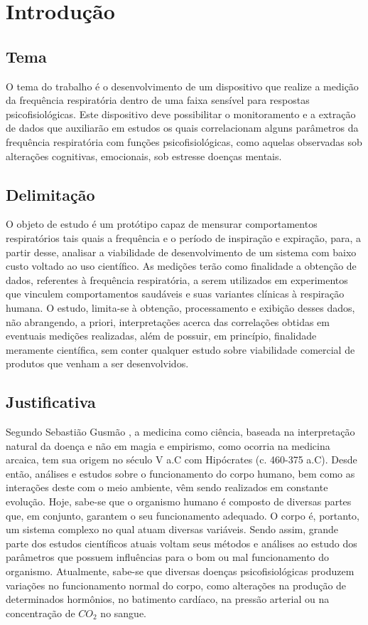 \chapter{Introdução}

	\section{Tema}
	
		O tema do trabalho é o desenvolvimento de um dispositivo que realize a medição da frequência respiratória dentro de uma faixa sensível para respostas psicofisiológicas. Este dispositivo deve possibilitar o monitoramento e a extração de dados que auxiliarão em estudos os quais correlacionam alguns parâmetros da frequência respiratória com funções psicofisiológicas, como aquelas observadas sob alterações cognitivas, emocionais, sob estresse  doenças mentais.
		
	\section{Delimitação}
		
		O objeto de estudo é um protótipo capaz de mensurar comportamentos respiratórios tais quais a frequência e o período de inspiração e expiração, para, a partir desse, analisar a viabilidade de desenvolvimento de um sistema com baixo custo voltado ao uso científico. As medições terão como finalidade a obtenção de dados, referentes à frequência respiratória, a serem utilizados em experimentos que vinculem comportamentos saudáveis e suas variantes clínicas à respiração humana. O estudo, limita-se à obtenção, processamento e exibição desses dados, não abrangendo, a priori, interpretações acerca das correlações obtidas em eventuais medições realizadas, além de possuir, em princípio, finalidade meramente científica, sem conter qualquer estudo sobre viabilidade comercial de produtos que venham a ser desenvolvidos.
		
	\section{Justificativa}
	
		Segundo Sebastião Gusmão \cite{gusmao2004historia}, a medicina como ciência, baseada na interpretação natural da doença e não em magia e empirismo, como ocorria na medicina arcaica, tem sua origem no século V a.C com Hipócrates (c. 460-375 a.C). Desde então, análises e estudos sobre o funcionamento do corpo humano, bem como as interações deste com o meio ambiente, vêm sendo realizados em constante evolução. Hoje, sabe-se que o organismo humano é composto de diversas partes que, em conjunto, garantem o seu funcionamento adequado. O corpo é, portanto, um sistema complexo no qual atuam diversas variáveis. Sendo assim, grande parte dos estudos científicos atuais voltam seus métodos e análises ao estudo dos parâmetros que possuem influências para o bom ou mal funcionamento do organismo. Atualmente, sabe-se que diversas doenças psicofisiológicas produzem variações no funcionamento normal do corpo, como alterações na produção de determinados hormônios, no batimento cardíaco, na pressão arterial ou na concentração de $CO_2$ no sangue. 
		
